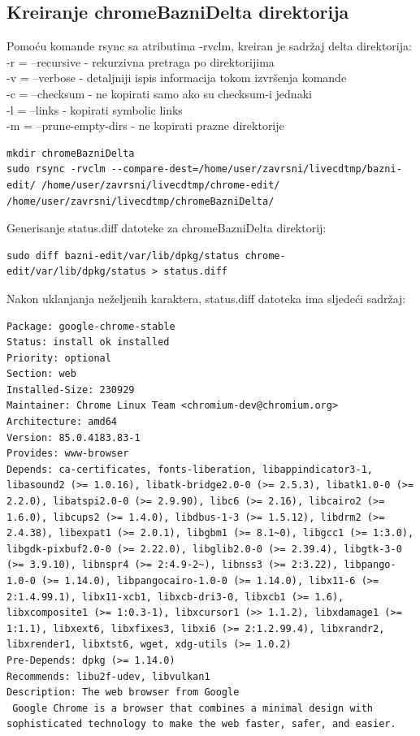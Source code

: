 \documentclass[12pt,vi]{mitthesis}
\begin{document}
\subsection*{Kreiranje chromeBazniDelta direktorija}
\indent
Pomoću komande rsync sa atributima -rvclm, kreiran je sadržaj delta direktorija:\\
\noindent
-r = --recursive - rekurzivna pretraga po direktorijima\\
\noindent
-v = --verbose - detaljniji ispis informacija tokom izvršenja komande\\
\noindent
-c = --checksum - ne kopirati samo ako su checksum-i jednaki\\
\noindent
-l = --links - kopirati symbolic links\\
\noindent
-m = --prune-empty-dirs - ne kopirati prazne direktorije\\
\begin{lstlisting}[style=BashInputStyle]
mkdir chromeBazniDelta
sudo rsync -rvclm --compare-dest=/home/user/zavrsni/livecdtmp/bazni-edit/ /home/user/zavrsni/livecdtmp/chrome-edit/ /home/user/zavrsni/livecdtmp/chromeBazniDelta/
\end{lstlisting}
\noindent
Generisanje status.diff datoteke za chromeBazniDelta direktorij:
\begin{lstlisting}[style=BashInputStyle]
sudo diff bazni-edit/var/lib/dpkg/status chrome-edit/var/lib/dpkg/status > status.diff
\end{lstlisting}
\noindent
Nakon uklanjanja neželjenih karaktera, status.diff datoteka ima sljedeći sadržaj:
\begin{lstlisting}[style=BashInputStyle]
Package: google-chrome-stable
Status: install ok installed
Priority: optional
Section: web
Installed-Size: 230929
Maintainer: Chrome Linux Team <chromium-dev@chromium.org>
Architecture: amd64
Version: 85.0.4183.83-1
Provides: www-browser
Depends: ca-certificates, fonts-liberation, libappindicator3-1, libasound2 (>= 1.0.16), libatk-bridge2.0-0 (>= 2.5.3), libatk1.0-0 (>= 2.2.0), libatspi2.0-0 (>= 2.9.90), libc6 (>= 2.16), libcairo2 (>= 1.6.0), libcups2 (>= 1.4.0), libdbus-1-3 (>= 1.5.12), libdrm2 (>= 2.4.38), libexpat1 (>= 2.0.1), libgbm1 (>= 8.1~0), libgcc1 (>= 1:3.0), libgdk-pixbuf2.0-0 (>= 2.22.0), libglib2.0-0 (>= 2.39.4), libgtk-3-0 (>= 3.9.10), libnspr4 (>= 2:4.9-2~), libnss3 (>= 2:3.22), libpango-1.0-0 (>= 1.14.0), libpangocairo-1.0-0 (>= 1.14.0), libx11-6 (>= 2:1.4.99.1), libx11-xcb1, libxcb-dri3-0, libxcb1 (>= 1.6), libxcomposite1 (>= 1:0.3-1), libxcursor1 (>> 1.1.2), libxdamage1 (>= 1:1.1), libxext6, libxfixes3, libxi6 (>= 2:1.2.99.4), libxrandr2, libxrender1, libxtst6, wget, xdg-utils (>= 1.0.2)
Pre-Depends: dpkg (>= 1.14.0)
Recommends: libu2f-udev, libvulkan1
Description: The web browser from Google
 Google Chrome is a browser that combines a minimal design with sophisticated technology to make the web faster, safer, and easier.
\end{lstlisting}
\end{document}
